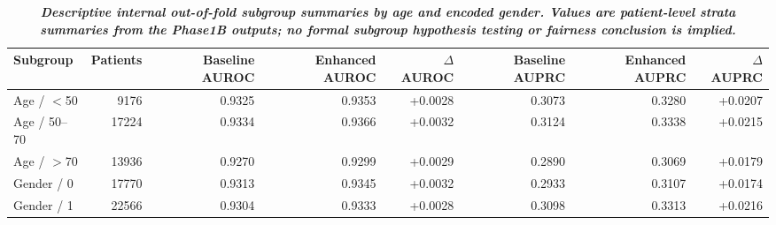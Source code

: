 \begin{table}[!t]
\centering
\caption{\textbf{\textit{Descriptive internal out-of-fold subgroup summaries by age and encoded gender. Values are patient-level strata summaries from the Phase1B outputs; no formal subgroup hypothesis testing or fairness conclusion is implied.}}}
\label{tab:phase10_demographic_subgroups}
\scriptsize
\renewcommand{\arraystretch}{1.10}
\begin{tabular*}{\textwidth}{@{\extracolsep{\fill}}lrrrrrrr}
\toprule
\textbf{Subgroup} & \textbf{Patients} & \textbf{Baseline AUROC} & \textbf{Enhanced AUROC} & \textbf{$\Delta$ AUROC} & \textbf{Baseline AUPRC} & \textbf{Enhanced AUPRC} & \textbf{$\Delta$ AUPRC} \\
\midrule
Age / $<$50 & 9176 & 0.9325 & 0.9353 & +0.0028 & 0.3073 & 0.3280 & +0.0207 \\
Age / 50--70 & 17224 & 0.9334 & 0.9366 & +0.0032 & 0.3124 & 0.3338 & +0.0215 \\
Age / $>$70 & 13936 & 0.9270 & 0.9299 & +0.0029 & 0.2890 & 0.3069 & +0.0179 \\
Gender / 0 & 17770 & 0.9313 & 0.9345 & +0.0032 & 0.2933 & 0.3107 & +0.0174 \\
Gender / 1 & 22566 & 0.9304 & 0.9333 & +0.0028 & 0.3098 & 0.3313 & +0.0216 \\
\bottomrule
\end{tabular*}
\end{table}
